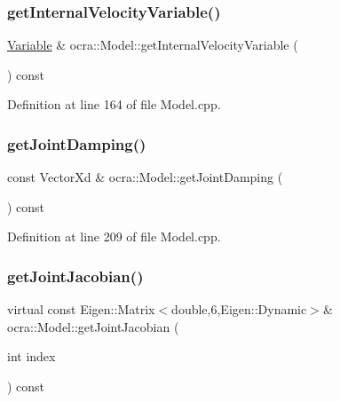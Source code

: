 \subsubsection{\texorpdfstring{get\+Internal\+Velocity\+Variable()}{getInternalVelocityVariable()}}
{\footnotesize\ttfamily \hyperlink{classocra_1_1Variable}{Variable} \& ocra\+::\+Model\+::get\+Internal\+Velocity\+Variable (\begin{DoxyParamCaption}{ }\end{DoxyParamCaption}) const}



Definition at line 164 of file Model.\+cpp.

\hypertarget{classocra_1_1Model_af2cfdd6af60477289b035fa376ec4058}{}\label{classocra_1_1Model_af2cfdd6af60477289b035fa376ec4058} 
\subsubsection{\texorpdfstring{get\+Joint\+Damping()}{getJointDamping()}}
{\footnotesize\ttfamily const Vector\+Xd \& ocra\+::\+Model\+::get\+Joint\+Damping (\begin{DoxyParamCaption}{ }\end{DoxyParamCaption}) const}



Definition at line 209 of file Model.\+cpp.

\hypertarget{classocra_1_1Model_ad0001f469b4aa484403e781f6bd933aa}{}\label{classocra_1_1Model_ad0001f469b4aa484403e781f6bd933aa} 
\subsubsection{\texorpdfstring{get\+Joint\+Jacobian()}{getJointJacobian()}\hspace{0.1cm}{\footnotesize\ttfamily [1/2]}}
{\footnotesize\ttfamily virtual const Eigen\+::\+Matrix$<$double,6,Eigen\+::\+Dynamic$>$\& ocra\+::\+Model\+::get\+Joint\+Jacobian (\begin{DoxyParamCaption}\item[{int}]{index }\end{DoxyParamCaption}) const\hspace{0.3cm}{\ttfamily [pure virtual]}}




